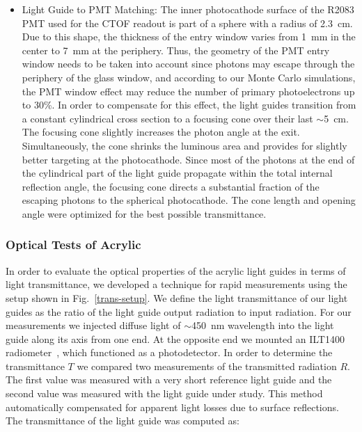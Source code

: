 \documentclass{elsart}
\begin{document}
\begin{itemize}
\item Light Guide to PMT Matching: The inner photocathode surface of the R2083 PMT used for
the CTOF readout is part of a sphere with a radius of 2.3~cm. Due to this shape, the thickness of the
entry window varies from 1~mm in the center to 7~mm at the periphery. Thus, the geometry of the
PMT entry window needs to be taken into account since photons may escape through the periphery
of the glass window, and according to our Monte Carlo simulations, the PMT window effect may
reduce the number of primary photoelectrons up to 30\%. In order to compensate for this effect,
the light guides transition from a constant cylindrical cross section to a focusing cone over their last 
$\sim$5~cm. The focusing cone slightly increases the photon angle at the exit. Simultaneously, 
the cone shrinks the luminous area and provides for slightly better targeting at the photocathode. 
Since most of the photons at the end of the cylindrical part of the light guide propagate within 
the total internal reflection angle, the focusing cone directs a substantial fraction of the 
escaping photons to the spherical photocathode. The cone length and opening angle were optimized 
for the best possible transmittance. 

\end{itemize}

\subsubsection{Optical Tests of Acrylic}
\label{optical-tests}
  
In order to evaluate the optical properties of the acrylic light guides in terms of light
transmittance, we developed a technique for rapid measurements using the setup shown in 
Fig.~\ref{trans-setup}. We define the light transmittance of our light guides as the ratio 
of the light guide output radiation to input radiation. For our measurements we injected 
diffuse light of $\sim$450~nm wavelength into the light guide along its axis from one end. 
At the opposite end we mounted an ILT1400 radiometer~\cite{ilt-ref}, which functioned as a
photodetector. In order to determine the transmittance $T$ we compared two measurements
of the transmitted radiation $R$. The first value was measured with a very short reference
light guide and the second value was measured with the light guide under study. This method
automatically compensated for apparent light losses due to surface reflections. The transmittance
of the light guide was computed as:  
\end{document}
